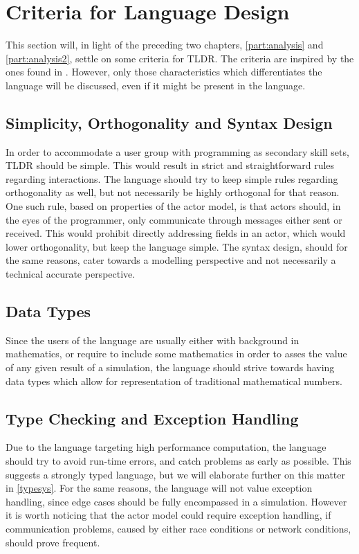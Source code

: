 \section{Criteria for Language Design}\label{analsum}

This section will, in light of the preceding two chapters, \cref{part:analysis} and \cref{part:analysis2}, settle on some criteria for TLDR. The criteria are inspired by the ones found in \cite{sebesta2015concepts}. However, only those characteristics which differentiates the language will be discussed, even if it might be present in the language.


\subsection{Simplicity, Orthogonality and Syntax Design}

In order to accommodate a user group with programming as secondary skill sets, TLDR should be simple. This would result in strict and straightforward rules regarding interactions. The language should try to keep simple rules regarding orthogonality as well, but not necessarily be highly orthogonal for that reason. One such rule, based on properties of the actor model, is that actors should, in the eyes of the programmer, only communicate through messages either sent or received. This would prohibit directly addressing fields in an actor, which would lower orthogonality, but keep the language simple. The syntax design, should for the same reasons, cater towards a modelling perspective and not necessarily a technical accurate perspective.

\subsection{Data Types}

Since the users of the language are usually either with background in mathematics, or require to include some mathematics in order to asses the value of any given result of a simulation, the language should strive towards having data types which allow for representation of traditional mathematical numbers.


\subsection{Type Checking and Exception Handling}

Due to the language targeting high performance computation, the language should try to avoid run-time errors, and catch problems as early as possible. This suggests a strongly typed language, but we will elaborate further on this matter in \cref{typesys}. For the same reasons, the language will not value exception handling, since edge cases should be fully encompassed in a simulation. However it is worth noticing that the actor model could require exception handling, if communication problems, caused by either race conditions or network conditions, should prove frequent.




